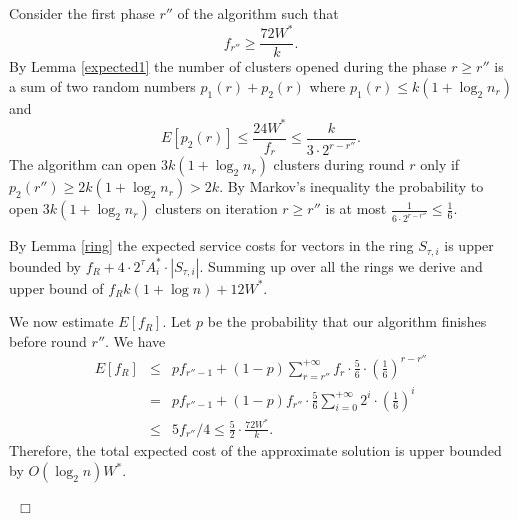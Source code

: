 \documentclass{article}
\newenvironment{proof}{\medskip\noindent {\bf Proof.}}{~\hfill$\Box$\medskip}
\begin{document}
\begin{proof}  Consider the first  phase $r''$ of the algorithm such that 
$$f_{r''}\ge \frac{72W^*}{k}.$$
By Lemma \ref{expected1} the  number of clusters opened  during the  phase $r\ge r''$ is a sum of two random numbers
$p_1(r)+p_2(r)$ where $p_1(r)\le k(1+\log_2n_{r})$ and 
$$E[p_2(r)]\le \frac{24W^*}{f_{r}} \le \frac{k}{3\cdot 2^{r-r''}}.$$
The algorithm can open   $3 k(1+\log_2n_r) $ clusters during round $r$ only if  $p_2(r'')\ge 2 k(1+\log_2n_r)>2k$. By Markov's inequality the probability to open  $3 k(1+\log_2n_r) $ clusters on iteration $r\ge r''$ is at most $\frac{1}{6\cdot 2^{r-r''}}\le \frac{1}{6}$.  

By Lemma \ref{ring} the expected service costs for vectors in the ring $S_{\tau,i}$ is upper bounded by $f_R+ 4\cdot 2^{\tau}A_i^*\cdot |S_{\tau,i}|$. Summing up over all the rings we derive and upper bound of
$f_Rk(1+\log n)+ 12W^*$.

We now estimate $E[f_R]$. Let $p$ be the probability that our algorithm finishes before round $r''$. We have
\begin{eqnarray*}
E[f_R]&\le& p f_{r''-1} + (1-p)\sum_{r=r''}^{+\infty}f_r\cdot \frac56 \cdot \left(\frac16\right)^{r-r''}\\
&=&p f_{r''-1} + (1-p)f_{r''}\cdot \frac56\sum_{i=0}^{+\infty}2^i\cdot \left(\frac16\right)^i\\
&\le& 5f_{r''}/4  \le \frac52 \cdot \frac{72W^*}{k}.
\end{eqnarray*}
 Therefore, the total expected cost of the approximate solution is upper bounded by $O(\log_2 n)W^*$.

\end{proof}

\end{document}
